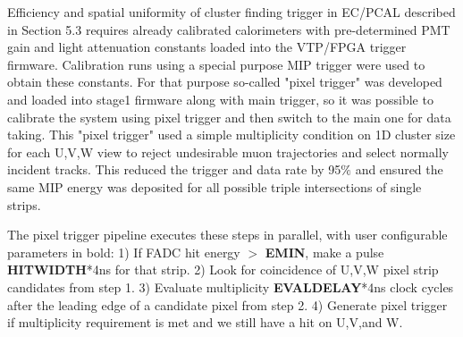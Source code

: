 Efficiency and spatial uniformity of cluster finding trigger in EC/PCAL described in Section 5.3 requires already calibrated calorimeters with pre-determined PMT gain and light attenuation constants loaded into the VTP/FPGA trigger firmware.  Calibration runs using a special purpose MIP trigger were used to obtain these constants. For that purpose so-called "pixel trigger" was developed and loaded into stage1 firmware along with main trigger, so it was possible to calibrate the system using pixel trigger and then switch to the main one for data taking. This "pixel trigger" used a simple multiplicity condition on 1D cluster size for each U,V,W view to reject undesirable muon trajectories and select normally incident tracks.  This reduced the trigger and data rate by 95$\%$ and ensured the same MIP energy was deposited for all possible triple intersections of single strips.

The pixel trigger pipeline executes these steps in parallel, with user configurable parameters in bold:
  1) If FADC hit energy $>$ \textbf{EMIN}, make a pulse \textbf{HITWIDTH}*4ns for that strip.
  2) Look for coincidence of U,V,W pixel strip candidates from step 1.
  3) Evaluate multiplicity \textbf{EVALDELAY}*4ns clock cycles after the leading edge of a candidate pixel from step 2.
  4) Generate pixel trigger if multiplicity requirement is met and we still have a hit on U,V,and W. 

